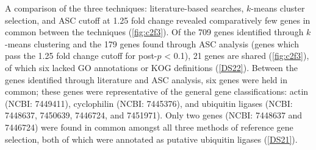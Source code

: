 A comparison of the three techniques: literature-based searches, $k$-means cluster selection, and ASC cutoff at 1.25 fold change revealed comparatively few genes in common between the techniques (\cref{fig:c2f3}). Of the 709 genes identified through $k$-means clustering and the 179 genes found through ASC analysis (genes which pass the 1.25 fold change cutoff for post-$p$ < 0.1), 21 genes are shared (\cref{fig:c2f3}), of which six lacked GO annotations or KOG definitions (\ref{DS22}). Between the genes identified through literature and ASC analysis, six genes were held in common; these genes were representative of the general gene classifications: actin (NCBI: 7449411), cyclophilin (NCBI: 7445376), and ubiquitin ligases (NCBI: 7448637, 7450639, 7446724, and 7451971). Only two genes (NCBI: 7448637 and 7446724) were found in common amongst all three methods of reference gene selection, both of which were annotated as putative ubiquitin ligases (\ref{DS21}). \par



